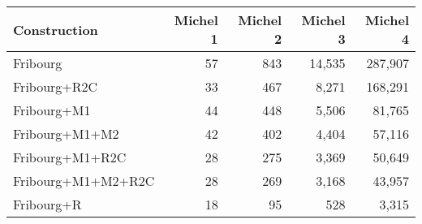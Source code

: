\begin{tabular}{lrrrr}
  \hline
Construction & Michel 1 & Michel 2 & Michel 3 & Michel 4 \\ 
  \hline
Fribourg & 57 & 843 & 14,535 & 287,907 \\ 
  Fribourg+R2C & 33 & 467 & 8,271 & 168,291 \\ 
  Fribourg+M1 & 44 & 448 & 5,506 & 81,765 \\ 
  Fribourg+M1+M2 & 42 & 402 & 4,404 & 57,116 \\ 
  Fribourg+M1+R2C & 28 & 275 & 3,369 & 50,649 \\ 
  Fribourg+M1+M2+R2C & 28 & 269 & 3,168 & 43,957 \\ 
  Fribourg+R & 18 & 95 & 528 & 3,315 \\ 
   \hline
\end{tabular}
